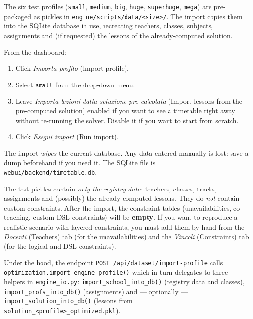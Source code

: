 The six test profiles (\texttt{small}, \texttt{medium},
\texttt{big}, \texttt{huge}, \texttt{superhuge}, \texttt{mega})
are pre-packaged as pickles in
\texttt{engine/scripts/data/<size>/}. The import copies them into
the SQLite database in use, recreating teachers, classes,
subjects, assignments and (if requested) the lessons of the
already-computed solution.

From the dashboard:

\begin{enumerate}
\item Click \emph{Importa profilo} (Import profile).
\item Select \texttt{small} from the drop-down menu.
\item Leave \emph{Importa lezioni dalla soluzione pre-calcolata}
  (Import lessons from the pre-computed solution) enabled if you
  want to see a timetable right away without re-running the
  solver. Disable it if you want to start from scratch.
\item Click \emph{Esegui import} (Run import).
\end{enumerate}

\begin{avvertenzabox}
The import \emph{wipes} the current database. Any data entered
manually is lost: save a dump beforehand if you need it. The
SQLite file is \texttt{webui/backend/timetable.db}.

The test pickles contain \emph{only the registry data}:
teachers, classes, tracks, assignments and (possibly) the
already-computed lessons. They do \emph{not} contain custom
constraints. After the import, the constraint tables
(unavailabilities, co-teaching, custom DSL constraints) will be
\textbf{empty}. If you want to reproduce a realistic scenario
with layered constraints, you must add them by hand from the
\emph{Docenti} (Teachers) tab (for the unavailabilities) and the
\emph{Vincoli} (Constraints) tab (for the logical and DSL
constraints).
\end{avvertenzabox}

\begin{biblioparvabox}
\sffamily
Under the hood, the endpoint
\texttt{POST /api/dataset/import-profile} calls
\texttt{optimization.import\_engine\_profile()} which in turn
delegates to three helpers in \texttt{engine\_io.py}:
\texttt{import\_school\_into\_db()} (registry data and classes),
\texttt{import\_profs\_into\_db()} (assignments) and ---
optionally ---
\texttt{import\_solution\_into\_db()} (lessons from
\texttt{solution\_<profile>\_optimized.pkl}).
\end{biblioparvabox}

